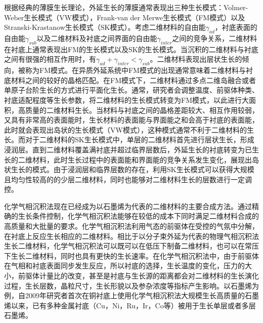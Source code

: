 根据经典的薄膜生长理论，外延生长的薄膜通常表现出三种生长模式：Volmer-Weber生长模式（VW模式），Frank-van der Merwe生长模式（FM模式）以及Stranski-Krastanow生长模式（SK模式）。考虑二维材料的自由能$\gamma_{ad}$，衬底表面的自由能$\gamma_{sub}$以及二维材料及衬底之间界面的自由能$\gamma_{inter}$之间的竞争关系，二维材料在衬底上通常表现出FM的生长模式以及SK的生长模式。当沉积的二维材料与衬底之间有很强的相互作用时，有$\gamma_{ad}+\gamma_{inter}<\gamma_{sub}$。二维材料表现出层状生长的倾向，被称为FM模式。在异质外延系统中FM模式的出现通常意味着二维材料与衬底材料之间的较好的晶格匹配。在FM模式下，二维材料通过多点二维岛融合或者单原子台阶生长的方式进行平面化生长。通常，研究者会调整温度、前驱体种类、衬底适配程度等生长参数，将二维材料的生长模式转变为FM模式，以此进行大面积，高质量的二维材料生长。当材料与衬底之间的晶格差距较大、相互作用较弱，又具有非常高的表面能时，生长材料的表面能与界面能之和会高于衬底的表面能，此时就会表现出岛状的生长模式（VW模式），这种模式通常不利于二维材料的生长。而对于二维材料的SK生长模式中，单层的二维材料首先进行层状生长，形成浸润层。直到二维材料覆盖满衬底并超过临界层数后，外延生长的衬底转变为已生长的二维材料，此时生长过程中的表面能和界面能的竞争关系发生变化，展现出岛状生长的模式。由于浸润层和临界层数的存在，利用SK生长模式可以获得大规模且均匀性较高的的少层二维材料，同时也能够对二维材料生长的层数进行一定调控。%

化学气相沉积法现在已经成为以石墨烯为代表的二维材料的主要合成方法。通过精确的生长条件控制，化学气相沉积法能够在较低的成本下同时满足二维材料合成的高质量和大批量的要求。化学气相沉积法利用气态的前驱体在受控的气氛中分解，在衬底上反应生长相应的二维材料。相比于以分子束外延为代表的物理气相沉积法生长二维材料，化学气相沉积法可以既可以在低压下制备二维材料，也可以在常压下生长二维材料，同时也具有更快的生长速率。在化学气相沉积法中，由于前驱体在气相和衬底表面同步发生反应，所以衬底的选择，生长温度的变化，压力的大小，前驱体计量比的改变，甚至是衬底与生长源的距离都会对二维材料的生长演化过程，生长层数，晶粒尺寸，生长形貌以及参杂浓度等指标产生影响。以石墨烯为例，自2009年研究者首次在铜衬底上使用化学气相沉积法大规模生长高质量的石墨烯以来，已有多种金属衬底（Cu，Ni，Ru，Ir，Co等）被用于生长单层或者多层石墨烯。%

